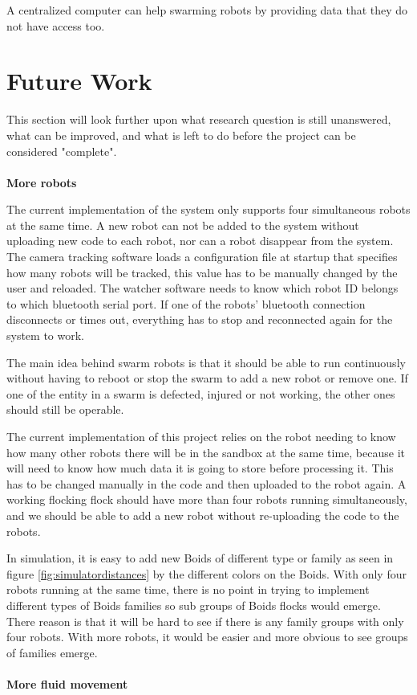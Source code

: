A centralized computer can help swarming robots by providing data that they do not have access too.




\section{Future Work}
\label{sec:futureWork}

This section will look further upon what research question is still unanswered, what can be improved, and what is left to do before the project can be considered "complete". \\\\
\textbf{More robots}

The current implementation of the system only supports four simultaneous robots at the same time. A new robot can not be added to the system without uploading new code to each robot, nor can a robot disappear from the system. The camera tracking software loads a configuration file at startup that specifies how many robots will be tracked, this value has to be manually changed by the user and reloaded.
The watcher software needs to know which robot ID belongs to which bluetooth serial port. If one of the robots' bluetooth connection disconnects or times out, everything has to stop and reconnected again for the system to work.

The main idea behind swarm robots is that it should be able to run continuously without having to reboot or stop the swarm to add a new robot or remove one. If one of the entity in a swarm is defected, injured or not working, the other ones should still be operable.

The current implementation of this project relies on the robot needing to know how many other robots there will be in the sandbox at the same time, because it will need to know how much data it is going to store before processing it. This has to be changed manually in the code and then uploaded to the robot again.
A working flocking flock should have more than four robots running simultaneously, and we should be able to add a new robot without re-uploading the code to the robots.

In simulation, it is easy to add new Boids of different type or family as seen in figure \ref{fig:simulatordistances} by the different colors on the Boids. With only four robots running at the same time, there is no point in trying to implement different types of Boids families so sub groups of Boids flocks would emerge. There reason is that it will be hard to see if there is any family groups with only four robots. With more robots, it would be easier and more obvious to see groups of families emerge. \\\\
\textbf{More fluid movement}

